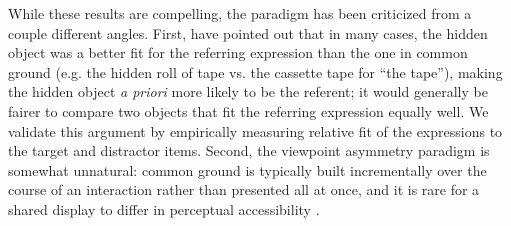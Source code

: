 \documentclass[10pt,letterpaper]{article}
\begin{document}
While these results are compelling, the paradigm has been criticized from a couple different angles. 
First,  have pointed out that in many cases, the hidden object was a better fit for the referring expression than the one in common ground (e.g. the hidden roll of tape vs. the cassette tape for ``the tape''), making the hidden object \emph{a priori} more likely to be the referent; it would generally be fairer to compare two objects that fit the referring expression equally well. 
We validate this argument by empirically measuring relative fit of the expressions to the target and distractor items.
Second, the viewpoint asymmetry paradigm is somewhat unnatural: common ground is typically built incrementally over the course of an interaction rather than presented all at once, and it is rare for a shared display to differ in perceptual accessibility \cite{HannaTanenhausTrueswell03_CommonGroundPerspective}. 
\end{document}
